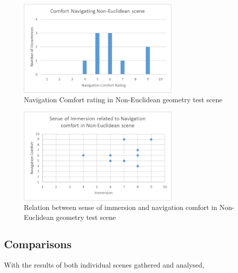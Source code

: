 			\begin{figure}[H]
				\includegraphics[width=0.7\textwidth]{Images/NE_Comfort}
				\centering
				\caption{Navigation Comfort rating in Non-Euclidean geometry test scene}
				\label{exp:fig:ne_comfort}
			\end{figure}

			\begin{figure}[H]
				\includegraphics[width=0.7\textwidth]{Images/NE_Relation}
				\centering
				\caption{Relation between sense of immersion and navigation comfort in Non-Euclidean geometry test scene}
				\label{exp:fig:ne_relation}
			\end{figure}

		\subsection{Comparisons}
		\label{exp:exp:comp}

			With the results of both individual scenes gathered and analysed, 



